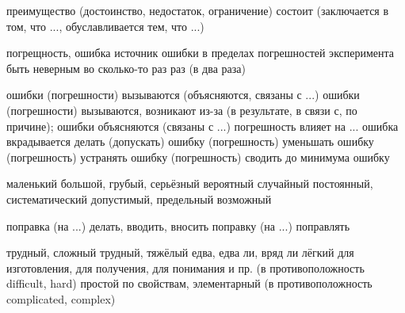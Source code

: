 	{преимущество (достоинство, недостаток, ограничение) состоит (заключается в том, что ..., 
	обуславливается тем, что ...)}

	{погрещность, ошибка}
	{источник ошибки}
	{в пределах погрешностей эксперимента}
	{быть неверным во сколько-то раз раз (в два раза)}

	{ошибки (погрешности) вызываются (объясняются, связаны с ...)}
	{ошибки (погрешности) вызываются, возникают из-за (в результате, в связи с, по причине); 
	ошибки объясняются (связаны с ...)}
	{погрешность влияет на ...}
	{ошибка вкрадывается}
	{делать (допускать) ошибку (погрешность)}
	{уменьшать ошибку (погрешность)}
	{устранять ошибку (погрешность)}
	{сводить до минимума ошибку}

	{маленький}
	{большой, грубый, серьёзный}
	{вероятный}
	{случайный}
	{постоянный, систематический}
	{допустимый, предельный}
	{возможный}

	{поправка (на ...)}
	{делать, вводить, вносить поправку (на ...)}
	{поправлять}

	{трудный, сложный}
	{трудный, тяжёлый}
	{едва, едва ли, вряд ли}
	{лёгкий для изготовления, для получения, для понимания и пр. (в противоположность difficult, 
	hard)}
	{простой по свойствам, элементарный (в противоположность complicated, complex)}

